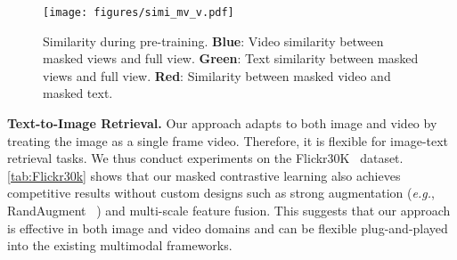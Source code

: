 \documentclass[10pt,twocolumn,letterpaper]{article}
\begin{document}
\begin{table}[]
\centering
{}
\caption{Comparison with Params and FLOPs during pre-training. The listed works are all based on the dual-stream architecture. We use 4 frames with 224 resolution for video and 128 of text length. }
\label{tab:flops and params}
\end{table}



\begin{figure}[t]
  \centering
  \texttt{[image: figures/simi\_mv\_v.pdf]}
   \caption{Similarity during pre-training. \textbf{Blue}: Video similarity between masked views and full view. \textbf{Green}: Text similarity between masked views and full view. \textbf{Red}: Similarity between masked video and masked text.}
   \label{fig:similarity}
\end{figure}

\vspace{1mm}\noindent\textbf{Text-to-Image Retrieval.} Our approach adapts to both image and video by treating the image as a single frame video. Therefore, it is flexible for image-text retrieval tasks. We thus conduct experiments on the Flickr30K~\cite{flickr30k} dataset. \cref{tab:Flickr30k} shows that our masked contrastive learning also achieves competitive results without custom designs such as strong augmentation (\emph{e.g.}, RandAugment ~\cite{randaugment}) and multi-scale feature fusion. This suggests that our approach is effective in both image and video domains and can be flexible plug-and-played into the existing multimodal frameworks.
\end{document}
